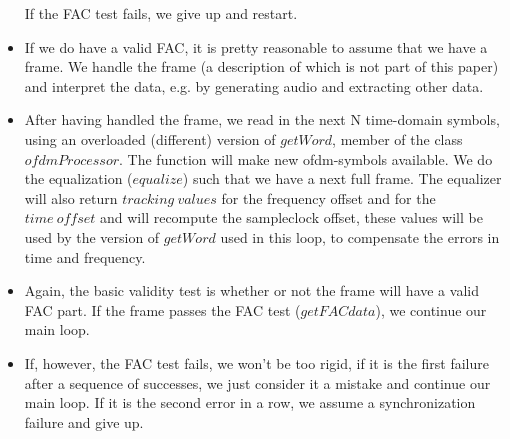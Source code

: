 \documentclass[11pt]{article}
\begin{document}
\begin{itemize}
If the FAC test fails, we give up and restart.
\item If we do have a valid FAC, it is pretty reasonable to
assume that we have a frame.
We handle the frame (a description of which
is not part of this paper) and interpret the data, e.g. by generating audio
and extracting other data.
\item After having handled the frame, we read in the next N time-domain
symbols, using an overloaded (different) version of $getWord$,
member of  the class $ofdmProcessor$. The function will make new ofdm-symbols
available.
We do the equalization ($equalize$) such that we have a next full frame.
The equalizer will also return $tracking\ values$ for the frequency
offset and for the $time\ offset$ and will recompute the
sampleclock offset, these
values will be used by the version of $getWord$  used in this loop,
to compensate the errors in time and frequency.
\item
Again, the basic validity test is whether or not the frame will have a valid
FAC part. If the frame passes the FAC test ($getFACdata$), we continue our main loop.
\item If, however, the FAC test fails, we won't be too rigid,
if it is the first failure
after a sequence of successes, we just consider it a mistake and continue
our main loop. If it is the second error in a row, we assume a synchronization
failure and give up. 
\end{itemize}
\end{document}
